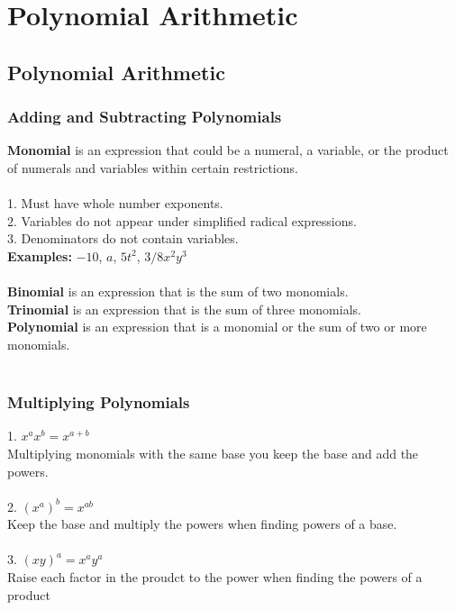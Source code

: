 \chapter{Polynomial Arithmetic}

\section{Polynomial Arithmetic}

\subsection{Adding and Subtracting Polynomials}
\textbf{Monomial} is an expression that could be a numeral, a variable, or the product of numerals and variables within certain restrictions.\\
\\
1. Must have whole number exponents.\\
2. Variables do not appear under simplified radical expressions.\\
3. Denominators do not contain variables.\\

\textbf{Examples:} $-10$, $a$, $5t^2$, $3/8x^2y^3$ \\
\\
\textbf{Binomial} is an expression that is the sum of two monomials.\\
\textbf{Trinomial} is an expression that is the sum of three monomials.\\
\textbf{Polynomial} is an expression that is a monomial or the sum of two or more monomials.\\
\\

\subsection{Multiplying Polynomials}
1. $x^ax^b = x^{a+b}$ \\Multiplying monomials with the same base you keep the base and add the powers.\\\\
2. $(x^a)^b = x^{ab}$\\ Keep the base and multiply the powers when finding powers of a base.\\\\
3. $(xy)^a = x^ay^a$ \\Raise each factor in the proudct to the power when finding the powers of a product\\\\

